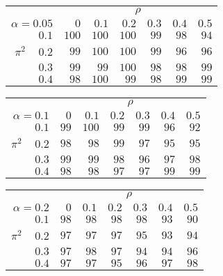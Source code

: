 \begin{tabular}{r|rrrrrr}
\hline\hline
 &\multicolumn{6}{c}{$\rho$} \\ 
 $\alpha = 0.05$ & $0$ & $0.1$ & $0.2$ & $0.3$ & $0.4$ & $0.5$ \\ 
 \hline$0.1$ & $100$ & $100$ & $100$ & $ 99$ & $ 98$ & $ 94$\\ 
$\pi^2\;\;\;$ $0.2$ & $ 99$ & $100$ & $100$ & $ 99$ & $ 96$ & $ 96$\\ 
$0.3$ & $ 99$ & $ 99$ & $100$ & $ 98$ & $ 98$ & $ 99$\\ 
$0.4$ & $ 98$ & $100$ & $ 99$ & $ 98$ & $ 99$ & $ 99$\\ 
 \hline 
 \end{tabular}
 
 \vspace{2em} 
 
\begin{tabular}{r|rrrrrr}
\hline\hline
 &\multicolumn{6}{c}{$\rho$} \\ 
 $\alpha = 0.1$ & $0$ & $0.1$ & $0.2$ & $0.3$ & $0.4$ & $0.5$ \\ 
 \hline$0.1$ & $ 99$ & $100$ & $ 99$ & $ 99$ & $ 96$ & $ 92$\\ 
$\pi^2\;\;\;$ $0.2$ & $ 98$ & $ 98$ & $ 99$ & $ 97$ & $ 95$ & $ 95$\\ 
$0.3$ & $ 99$ & $ 99$ & $ 98$ & $ 96$ & $ 97$ & $ 98$\\ 
$0.4$ & $ 98$ & $ 98$ & $ 97$ & $ 97$ & $ 99$ & $ 99$\\ 
 \hline 
 \end{tabular}
 
 \vspace{2em} 
 
\begin{tabular}{r|rrrrrr}
\hline\hline
 &\multicolumn{6}{c}{$\rho$} \\ 
 $\alpha = 0.2$ & $0$ & $0.1$ & $0.2$ & $0.3$ & $0.4$ & $0.5$ \\ 
 \hline$0.1$ & $98$ & $98$ & $98$ & $98$ & $93$ & $90$\\ 
$\pi^2\;\;\;$ $0.2$ & $97$ & $97$ & $97$ & $95$ & $93$ & $94$\\ 
$0.3$ & $97$ & $98$ & $97$ & $94$ & $94$ & $96$\\ 
$0.4$ & $97$ & $97$ & $95$ & $96$ & $97$ & $98$\\ 
 \hline 
 \end{tabular}